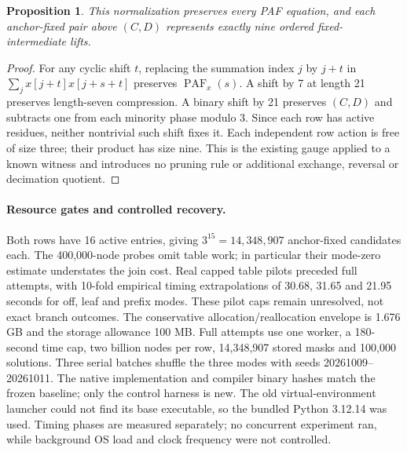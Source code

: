 \documentclass[11pt]{article}
\newtheorem{proposition}[theorem]{Proposition}
\newcommand{\PAF}{\operatorname{PAF}}
\begin{document}
\begin{proposition}
This normalization preserves every PAF equation, and each anchor-fixed
pair above $(C,D)$ represents exactly nine ordered fixed-intermediate lifts.
\end{proposition}
\begin{proof}
For any cyclic shift $t$, replacing the summation index $j$ by $j+t$ in
$\sum_jx[j+t]x[j+s+t]$ preserves $\PAF_x(s)$. A shift by 7 at length 21
preserves length-seven compression. A binary shift by 21 preserves $(C,D)$
and subtracts one from each minority phase modulo 3. Since each row has
active residues, neither nontrivial such shift fixes it. Each independent
row action is free of size three; their product has size nine. This is the
existing gauge applied to a known witness and introduces no pruning rule
or additional exchange, reversal or decimation quotient.
\end{proof}

\paragraph{Resource gates and controlled recovery.}
Both rows have 16 active entries, giving $3^{15}=14,348,907$ anchor-fixed
candidates each. The 400,000-node probes omit table work; in particular
their mode-zero estimate understates the join cost. Real capped table
pilots preceded full attempts, with 10-fold empirical timing extrapolations
of 30.68, 31.65 and 21.95 seconds for off, leaf and prefix modes.
These pilot caps remain unresolved, not exact branch outcomes.
The conservative allocation/reallocation envelope is 1.676 GB and the
storage allowance 100 MB. Full attempts use one worker, a 180-second time
cap, two billion nodes per row, 14,348,907 stored masks and 100,000 solutions.
Three serial batches shuffle the three modes with seeds 20261009--20261011.
The native implementation and compiler binary hashes match the frozen
baseline; only the control harness is new. The old virtual-environment
launcher could not find its base executable, so the bundled Python 3.12.14
was used. Timing phases are measured separately; no concurrent experiment
ran, while background OS load and clock frequency were not controlled.
\end{document}
